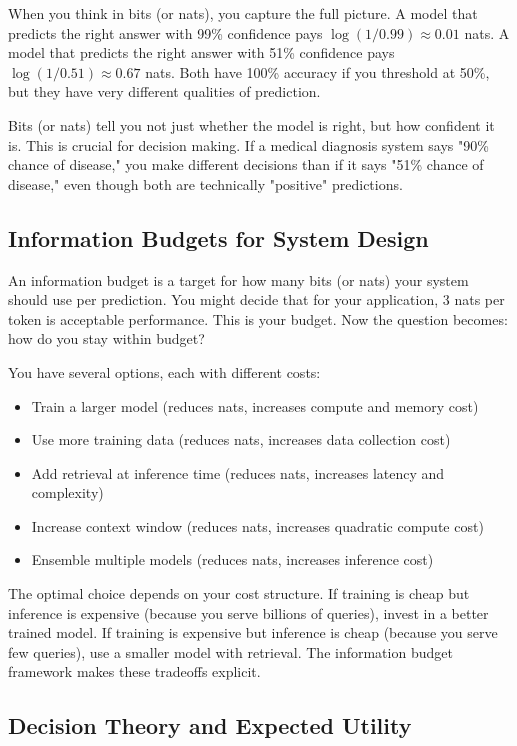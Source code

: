 When you think in bits (or nats), you capture the full picture. A model that predicts the right answer with 99\% confidence pays $\log(1/0.99) \approx 0.01$ nats. A model that predicts the right answer with 51\% confidence pays $\log(1/0.51) \approx 0.67$ nats. Both have 100\% accuracy if you threshold at 50\%, but they have very different qualities of prediction.

Bits (or nats) tell you not just whether the model is right, but how confident it is. This is crucial for decision making. If a medical diagnosis system says "90\% chance of disease," you make different decisions than if it says "51\% chance of disease," even though both are technically "positive" predictions.

\subsection{Information Budgets for System Design}

An information budget is a target for how many bits (or nats) your system should use per prediction. You might decide that for your application, 3 nats per token is acceptable performance. This is your budget. Now the question becomes: how do you stay within budget?

You have several options, each with different costs:

\begin{itemize}
\item Train a larger model (reduces nats, increases compute and memory cost)
\item Use more training data (reduces nats, increases data collection cost)
\item Add retrieval at inference time (reduces nats, increases latency and complexity)
\item Increase context window (reduces nats, increases quadratic compute cost)
\item Ensemble multiple models (reduces nats, increases inference cost)
\end{itemize}

The optimal choice depends on your cost structure. If training is cheap but inference is expensive (because you serve billions of queries), invest in a better trained model. If training is expensive but inference is cheap (because you serve few queries), use a smaller model with retrieval. The information budget framework makes these tradeoffs explicit.

\subsection{Decision Theory and Expected Utility}

